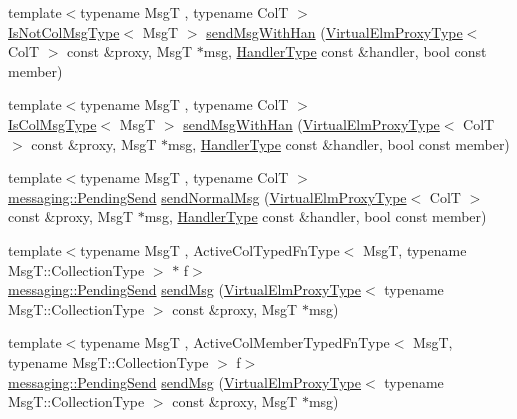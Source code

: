 \begin{DoxyCompactItemize}
\item 
{\footnotesize template$<$typename MsgT , typename ColT $>$ }\\\hyperlink{structvt_1_1vrt_1_1collection_1_1_collection_manager_ae376deeefd4f89a0b1c93849977715d9}{Is\+Not\+Col\+Msg\+Type}$<$ MsgT $>$ \hyperlink{structvt_1_1vrt_1_1collection_1_1_collection_manager_a416015d4b3a1bfe6dd7088b48e1f48f5}{send\+Msg\+With\+Han} (\hyperlink{namespacevt_1_1vrt_a620a5c8c59d13e513f690c74b4af516f}{Virtual\+Elm\+Proxy\+Type}$<$ ColT $>$ const \&proxy, MsgT $\ast$msg, \hyperlink{namespacevt_af64846b57dfcaf104da3ef6967917573}{Handler\+Type} const \&handler, bool const member)
\item 
{\footnotesize template$<$typename MsgT , typename ColT $>$ }\\\hyperlink{structvt_1_1vrt_1_1collection_1_1_collection_manager_a21c21612c806016788057aeab142af20}{Is\+Col\+Msg\+Type}$<$ MsgT $>$ \hyperlink{structvt_1_1vrt_1_1collection_1_1_collection_manager_a7be0a9b42876d4eb28b26eccb37351a3}{send\+Msg\+With\+Han} (\hyperlink{namespacevt_1_1vrt_a620a5c8c59d13e513f690c74b4af516f}{Virtual\+Elm\+Proxy\+Type}$<$ ColT $>$ const \&proxy, MsgT $\ast$msg, \hyperlink{namespacevt_af64846b57dfcaf104da3ef6967917573}{Handler\+Type} const \&handler, bool const member)
\item 
{\footnotesize template$<$typename MsgT , typename ColT $>$ }\\\hyperlink{structvt_1_1messaging_1_1_pending_send}{messaging\+::\+Pending\+Send} \hyperlink{structvt_1_1vrt_1_1collection_1_1_collection_manager_a9b58618d5d3eec7ac198b7c465288599}{send\+Normal\+Msg} (\hyperlink{namespacevt_1_1vrt_a620a5c8c59d13e513f690c74b4af516f}{Virtual\+Elm\+Proxy\+Type}$<$ ColT $>$ const \&proxy, MsgT $\ast$msg, \hyperlink{namespacevt_af64846b57dfcaf104da3ef6967917573}{Handler\+Type} const \&handler, bool const member)
\item 
{\footnotesize template$<$typename MsgT , Active\+Col\+Typed\+Fn\+Type$<$ Msg\+T, typename Msg\+T\+::\+Collection\+Type $>$ $\ast$ f$>$ }\\\hyperlink{structvt_1_1messaging_1_1_pending_send}{messaging\+::\+Pending\+Send} \hyperlink{structvt_1_1vrt_1_1collection_1_1_collection_manager_a3165b258fab15c35985b3f9b8ef0dbe7}{send\+Msg} (\hyperlink{namespacevt_1_1vrt_a620a5c8c59d13e513f690c74b4af516f}{Virtual\+Elm\+Proxy\+Type}$<$ typename Msg\+T\+::\+Collection\+Type $>$ const \&proxy, MsgT $\ast$msg)
\item 
{\footnotesize template$<$typename MsgT , Active\+Col\+Member\+Typed\+Fn\+Type$<$ Msg\+T, typename Msg\+T\+::\+Collection\+Type $>$ f$>$ }\\\hyperlink{structvt_1_1messaging_1_1_pending_send}{messaging\+::\+Pending\+Send} \hyperlink{structvt_1_1vrt_1_1collection_1_1_collection_manager_a3165b258fab15c35985b3f9b8ef0dbe7}{send\+Msg} (\hyperlink{namespacevt_1_1vrt_a620a5c8c59d13e513f690c74b4af516f}{Virtual\+Elm\+Proxy\+Type}$<$ typename Msg\+T\+::\+Collection\+Type $>$ const \&proxy, MsgT $\ast$msg)

\end{DoxyCompactItemize}
